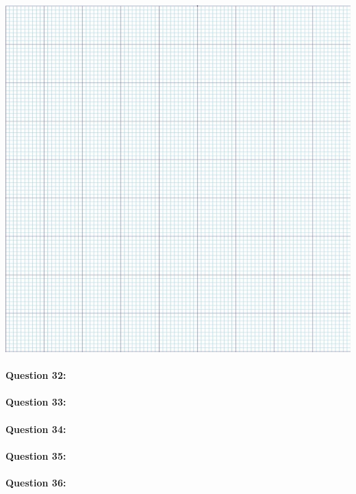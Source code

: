 \begin{center}
\begin{minipage}{0.49\linewidth}
	\includegraphics[width=\linewidth]{img/rep4}
\end{minipage}
\end{center}

\paragraph{Question 32:}

\reponse[3]

\paragraph{Question 33:}

\reponse[3]

\paragraph{Question 34:}

\reponse[6]

\paragraph{Question 35:}

\reponse[6]

\paragraph{Question 36:}

